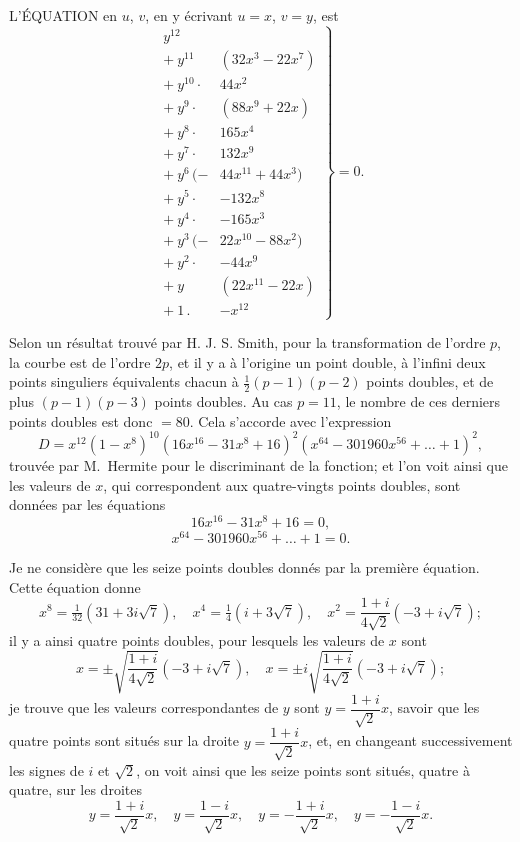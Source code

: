 \documentclass[11pt,a4paper]{article}
\begin{document}
\noindent L'\'EQUATION en $u$, $v$, en y \'ecrivant $u = x$, $v = y$, est
\[
\left.\begin{array}{rl}
y^{12} & \\
+\ y^{11} & (32x^3 - 22x^7) \\
+\ y^{10} \cdot & 44x^2 \\
+\ y^9 \cdot & (88x^9 + 22x) \\
+\ y^8 \cdot & 165x^4 \\
+\ y^7 \cdot & 132x^9 \\
+\ y^6\,(- & 44x^{11} + 44x^3) \\
+\ y^5 \cdot & -132x^8 \\
+\ y^4 \cdot & -165x^3 \\
+\ y^3\,(- & 22x^{10} - 88x^2) \\
+\ y^2 \cdot & -44x^9 \\
+\ y & (22x^{11} - 22x) \\
+\ 1\,. & -x^{12}
\end{array}\right\} = 0.
\]

Selon un résultat trouvé par H. J. S. Smith, pour la transformation de l'ordre $p$, la courbe est de l'ordre $2p$, et il y a à l'origine un point double, à l'infini deux points singuliers équivalents chacun à $\tfrac{1}{2}(p - 1)(p - 2)$ points doubles, et de plus $(p - 1)(p - 3)$ points doubles. Au cas $p = 11$, le nombre de ces derniers points doubles est donc $= 80$. Cela s'accorde avec l'expression
\[
D = x^{12}(1 - x^8)^{10}(16x^{16} - 31x^8 + 16)^2 (x^{64} - 301960x^{56} + \ldots + 1)^2,
\]
trouvée par M.\ Hermite pour le discriminant de la fonction; et l'on voit ainsi que les valeurs de $x$, qui correspondent aux quatre-vingts points doubles, sont données par les équations
\[
16x^{16} - 31x^8 + 16 = 0,
\]
\[
x^{64} - 301960 x^{56} + \ldots + 1 = 0.
\]

Je ne considère que les seize points doubles donnés par la première équation. Cette équation donne
\[
x^8 = \tfrac{1}{32}(31 + 3i\sqrt{7}),\quad x^4 = \tfrac{1}{4}(i + 3\sqrt{7}),\quad x^2 = \frac{1 + i}{4\sqrt{2}}(-3 + i\sqrt{7});
\]
il y a ainsi quatre points doubles, pour lesquels les valeurs de $x$ sont
\[
x = \pm \sqrt{\frac{1 + i}{4\sqrt{2}}}(-3 + i\sqrt{7}),\quad x = \pm i\sqrt{\frac{1 + i}{4\sqrt{2}}}(-3 + i\sqrt{7});
\]
je trouve que les valeurs correspondantes de $y$ sont $y = \dfrac{1 + i}{\sqrt{2}}x$, savoir que les quatre points sont situés sur la droite $y = \dfrac{1 + i}{\sqrt{2}} x$, et, en changeant successivement les signes de $i$ et $\sqrt{2}$, on voit ainsi que les seize points sont situés, quatre à quatre, sur les droites
\[
y = \frac{1 + i}{\sqrt{2}} x,\quad y = \frac{1 - i}{\sqrt{2}} x,\quad y = -\frac{1 + i}{\sqrt{2}} x,\quad y = -\frac{1 - i}{\sqrt{2}} x.
\]
\end{document}

